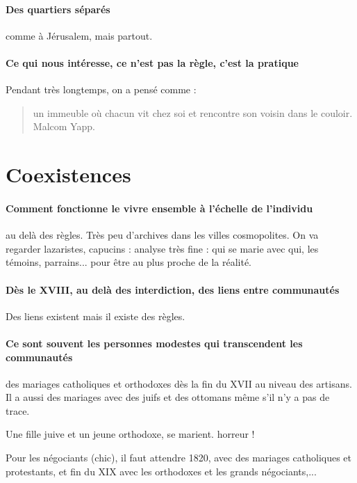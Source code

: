 \paragraph{Des quartiers séparés} comme à Jérusalem, mais partout.

\paragraph{Ce qui nous intéresse, ce n'est pas la règle, c'est la pratique} Pendant très longtemps, on a pensé comme :
\begin{quote}
    {un immeuble où chacun vit chez soi et rencontre son voisin dans le couloir. Malcom Yapp.}
\end{quote}


\section{Coexistences}

\paragraph{Comment fonctionne le vivre ensemble à l'échelle de l'individu} au delà des règles. 
Très peu d'archives dans les villes cosmopolites. On va regarder lazaristes, capucins : analyse très fine : qui se marie avec qui, les témoins, parrains... pour être au plus proche de la réalité.

\paragraph{Dès le XVIII, au delà des interdiction, des liens entre communautés} Des liens existent mais il existe des règles. 

\paragraph{Ce sont souvent les personnes modestes qui transcendent les communautés} des mariages catholiques et orthodoxes dès la fin du XVII au niveau des artisans. Il a aussi des mariages avec des juifs et des ottomans même s'il n'y a pas de trace.
\begin{Ex}
    Une fille juive et un jeune orthodoxe, se marient. horreur ! 
\end{Ex}
Pour les négociants (chic), il faut attendre 1820, avec des mariages catholiques et protestants, et fin du XIX avec les orthodoxes et les grands négociants,...

